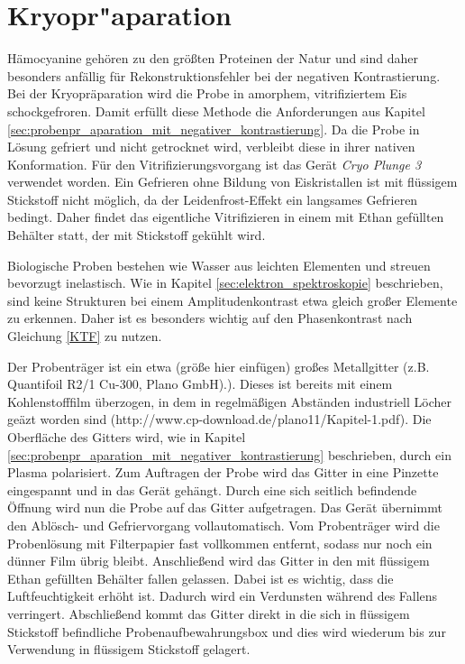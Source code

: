 \section{Kryopr"aparation}
\label{sec:probenpr_aparation_mit_kryopr_aparation}

Hämocyanine gehören zu den größten Proteinen der Natur und sind daher besonders anfällig für Rekonstruktionsfehler bei der negativen Kontrastierung.
Bei der Kryopräparation wird die Probe in amorphem, vitrifiziertem Eis schockgefroren.
Damit erfüllt diese Methode die Anforderungen aus Kapitel \ref{sec:probenpr_aparation_mit_negativer_kontrastierung}.
Da die Probe in Lösung gefriert und nicht getrocknet wird, verbleibt diese in ihrer nativen Konformation.
Für den Vitrifizierungsvorgang ist das Gerät \textit{Cryo Plunge 3} verwendet worden.
Ein Gefrieren ohne Bildung von Eiskristallen ist mit flüssigem Stickstoff nicht möglich, da der Leidenfrost-Effekt ein langsames Gefrieren bedingt.
Daher findet das eigentliche Vitrifizieren in einem mit Ethan gefüllten Behälter statt, der mit Stickstoff gekühlt wird.

Biologische Proben bestehen wie Wasser aus leichten Elementen und streuen bevorzugt inelastisch.
Wie in Kapitel \ref{sec:elektron_spektroskopie} beschrieben, sind keine Strukturen bei einem Amplitudenkontrast etwa gleich großer Elemente zu erkennen.
Daher ist es besonders wichtig auf den Phasenkontrast nach Gleichung \eqref{KTF} zu nutzen.

Der Probenträger ist ein etwa (größe hier einfügen) großes Metallgitter (z.B. Quantifoil R2/1 Cu-300, Plano GmbH).).
Dieses ist bereits mit einem Kohlenstofffilm überzogen, in dem in regelmäßigen Abständen industriell Löcher geäzt worden sind (http://www.cp-download.de/plano11/Kapitel-1.pdf).
Die Oberfläche des Gitters wird, wie in Kapitel \ref{sec:probenpr_aparation_mit_negativer_kontrastierung} beschrieben, durch ein Plasma polarisiert.
Zum Auftragen der Probe wird das Gitter in eine Pinzette eingespannt und in das Gerät gehängt.
Durch eine sich seitlich befindende Öffnung wird nun die Probe auf das Gitter aufgetragen.
Das Gerät übernimmt den Ablösch- und Gefriervorgang vollautomatisch.
Vom Probenträger wird die Probenlösung mit Filterpapier fast vollkommen entfernt, sodass nur noch ein dünner Film übrig bleibt.
Anschließend wird das Gitter in den mit flüssigem Ethan gefüllten Behälter fallen gelassen.
Dabei ist es wichtig, dass die Luftfeuchtigkeit erhöht ist.
Dadurch wird ein Verdunsten während des Fallens verringert.
Abschließend kommt das Gitter direkt in die sich in flüssigem Stickstoff befindliche Probenaufbewahrungsbox und dies wird wiederum bis zur Verwendung in flüssigem Stickstoff gelagert.

\FloatBarrier